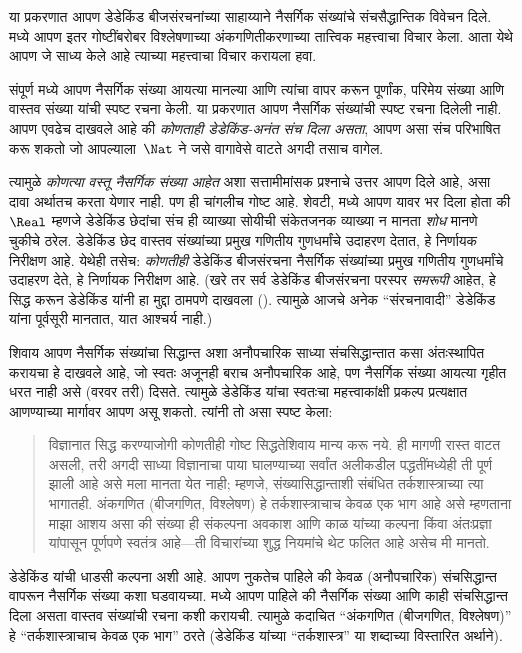 \documentclass[../../../include/open-logic-section]{subfiles}
\begin{document}


या प्रकरणात आपण डेडेकिंड बीजसंरचनांच्या साहाय्याने नैसर्गिक संख्यांचे
संचसैद्धान्तिक विवेचन दिले.  मध्ये आपण इतर
गोष्टींबरोबर विश्लेषणाच्या अंकगणितीकरणाच्या तात्त्विक महत्त्वाचा विचार
केला. आता येथे आपण जे साध्य केले आहे त्याच्या महत्त्वाचा विचार करायला हवा.

संपूर्ण  मध्ये आपण नैसर्गिक संख्या आयत्या
मानल्या आणि त्यांचा वापर करून पूर्णांक, परिमेय संख्या आणि वास्तव संख्या
यांची स्पष्ट रचना केली. या प्रकरणात आपण नैसर्गिक संख्यांची स्पष्ट रचना
दिलेली नाही. आपण एवढेच दाखवले आहे की \emph{कोणताही डेडेकिंड-अनंत संच
दिला असता}, आपण असा संच परिभाषित करू शकतो जो आपल्याला~$\Nat$ ने जसे
वागावेसे वाटते अगदी तसाच वागेल.

त्यामुळे \emph{कोणत्या वस्तू नैसर्गिक संख्या आहेत} अशा सत्तामीमांसक
प्रश्नाचे उत्तर आपण दिले आहे, असा दावा अर्थातच करता येणार नाही. पण ही
चांगलीच गोष्ट आहे. शेवटी,  मध्ये आपण यावर
भर दिला होता की $\Real$ म्हणजे डेडेकिंड छेदांचा संच ही व्याख्या सोयीची
संकेतजनक व्याख्या न मानता \emph{शोध} मानणे चुकीचे ठरेल. डेडेकिंड छेद
वास्तव संख्यांच्या प्रमुख गणितीय गुणधर्मांचे उदाहरण देतात, हे निर्णायक
निरीक्षण आहे. येथेही तसेच: \emph{कोणतीही} डेडेकिंड बीजसंरचना नैसर्गिक
संख्यांच्या प्रमुख गणितीय गुणधर्मांचे उदाहरण देते, हे निर्णायक निरीक्षण
आहे. (खरे तर सर्व डेडेकिंड बीजसंरचना परस्पर \emph{समरूपी} आहेत, हे
सिद्ध करून डेडेकिंड यांनी हा मुद्दा ठामपणे दाखवला
(\citeyear[Theorems
132--3]{Dedekind1888}). त्यामुळे आजचे अनेक
``संरचनावादी'' डेडेकिंड यांना पूर्वसूरी मानतात, यात आश्चर्य नाही.)

 शिवाय आपण नैसर्गिक संख्यांचा सिद्धान्त अशा अनौपचारिक साध्या
 संचसिद्धान्तात कसा अंतःस्थापित करायचा हे दाखवले आहे, जो स्वतः अजूनही
 बराच अनौपचारिक आहे, पण नैसर्गिक संख्या आयत्या गृहीत धरत नाही असे
 (वरवर तरी) दिसते. त्यामुळे डेडेकिंड यांचा स्वतःचा महत्त्वाकांक्षी
 प्रकल्प प्रत्यक्षात आणण्याच्या मार्गावर आपण असू शकतो. त्यांनी तो असा
 स्पष्ट केला:
\begin{quote}
	विज्ञानात सिद्ध करण्याजोगी कोणतीही गोष्ट सिद्धतेशिवाय मान्य करू नये.
	ही मागणी रास्त वाटत असली, तरी अगदी साध्या विज्ञानाचा पाया घालण्याच्या
	सर्वांत अलीकडील पद्धतींमध्येही ती पूर्ण झाली आहे असे मला मानता येत
	नाही; म्हणजे, संख्यासिद्धान्ताशी संबंधित तर्कशास्त्राच्या त्या भागातही.
	अंकगणित (बीजगणित, विश्लेषण) हे तर्कशास्त्राचाच केवळ एक भाग आहे असे
	म्हणताना माझा आशय असा की संख्या ही संकल्पना अवकाश आणि काळ यांच्या
	कल्पना किंवा अंतःप्रज्ञा यांपासून पूर्णपणे स्वतंत्र आहे---ती विचारांच्या
	शुद्ध नियमांचे थेट फलित आहे असेच मी मानतो.
	\citep[preface]{Dedekind1888}
\end{quote}
डेडेकिंड यांची धाडसी कल्पना अशी आहे. आपण नुकतेच पाहिले की केवळ
(अनौपचारिक) संचसिद्धान्त वापरून नैसर्गिक संख्या कशा घडवायच्या.
 मध्ये आपण पाहिले की नैसर्गिक संख्या आणि काही
संचसिद्धान्त दिला असता वास्तव संख्यांची रचना कशी करायची. त्यामुळे कदाचित
``अंकगणित (बीजगणित, विश्लेषण)'' हे ``तर्कशास्त्राचाच केवळ एक भाग'' ठरते
(डेडेकिंड यांच्या ``तर्कशास्त्र'' या शब्दाच्या विस्तारित अर्थाने).
\end{document}
